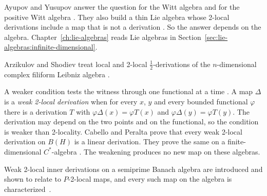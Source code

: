 Ayupov and Yusupov answer the question for the Witt algebra and for the
positive Witt algebra \cite[Theorem~4.1, p.~4; Theorem~4.4,
p.~6]{AyupovYusupov2020}. They also build a thin Lie algebra whose 2-local
derivations include a map that is not a derivation \cite[Theorem~4.8,
p.~8]{AyupovYusupov2020}. So the answer depends on the algebra.
Chapter~\ref{ch:lie-algebras} reads Lie algebras in
Section~\ref{sec:lie-algebras:infinite-dimensional}.

Arzikulov and Shodiev treat local and 2-local $\frac12$-derivations of the
$n$-dimensional complex filiform Leibniz algebra
\cite[Abstract, p.~1]{ArzikulovShodiev2026}.

A weaker condition tests the witness through one functional at a time
\cite[p.~382]{CabelloPeralta2017Weak}. A map $\Delta$ is a \emph{weak 2-local
derivation} \cite[p.~382]{CabelloPeralta2017Weak} when for every $x$, $y$ and
every bounded functional $\varphi$ there is a derivation $T$ with
$\varphi\Delta(x)=\varphi T(x)$ and $\varphi\Delta(y)=\varphi T(y)$. The
derivation may depend on the two points and on the functional, so the
condition is weaker than 2-locality. Cabello and Peralta prove that every weak
2-local derivation on $B(H)$ is a linear derivation. They prove the same on a
finite-dimensional $C^{\ast}$-algebra \cite[Theorems~1.1 and~1.2,
p.~383]{CabelloPeralta2017Weak}. The weakening produces no new map on these
algebras.

Weak 2-local inner derivations on a semiprime Banach algebra are introduced
and shown to relate to $P$-2-local maps, and every such map on the algebra is
characterized~\cite{WlWeak2LocalInnerDerivationsOfSe2020}.
